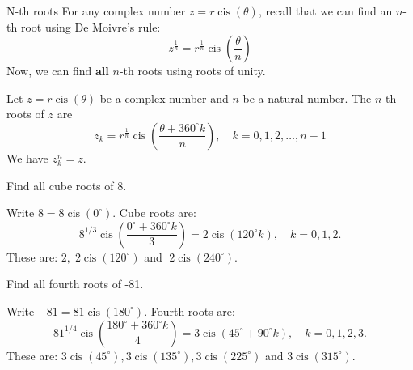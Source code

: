 \begin{frame}{N-th roots}
For any complex number $z = r\operatorname{cis}\!\left(\theta\right)$, recall that we can find an $n$-th root using De Moivre's rule:
\[ z^{\frac{1}{n}} = r^{\frac{1}{n}} \operatorname{cis}\!\left(\frac{\theta}{n}\right)\]
Now, we can find \textbf{all} $n$-th roots using roots of unity.
\begin{thm}{}{}
Let $z=r\operatorname{cis}\!\left(\theta\right)$ be a complex number and $n$ be a natural number. The $n$-th roots of $z$ are
\begin{equation}
z_k = r^{\frac{1}{n}} \operatorname{cis}\!\left(\frac{\theta + 360^\circ k}{n}\right), \quad k=0,1,2,\ldots,n-1
\end{equation}
We have $z_k^n = z$.
\end{thm}
\end{frame}

\begin{frame}[t]
\begin{ex}
Find all cube roots of 8.
\end{ex}
\begin{sol}
Write $8 = 8 \operatorname{cis}\!\left(0^\circ\right)$. Cube roots are:
\[ 8^{1/3} \operatorname{cis}\!\left(\frac{0^\circ + 360^\circ k}{3}\right) = 2 \operatorname{cis}\!\left(120^\circ k\right),\quad k=0,1,2. \]
These are: $2,\; 2\operatorname{cis}\!\left(120^\circ\right)$ and $\; 2\operatorname{cis}\!\left(240^\circ\right).$
\end{sol}
\end{frame}

\begin{frame}[t]
\begin{ex}
Find all fourth roots of -81.
\end{ex}
\begin{sol}
Write $-81 = 81 \operatorname{cis}\!\left(180^\circ\right)$. Fourth roots are:
\[ 81^{1/4} \operatorname{cis}\!\left(\frac{180^\circ + 360^\circ k}{4}\right) = 3 \operatorname{cis}\!\left(45^\circ + 90^\circ k\right),\quad k=0,1,2,3. \]
These are: $3 \operatorname{cis}\!\left(45^\circ\right), 3\operatorname{cis}\!\left(135^\circ\right), 3\operatorname{cis}\!\left(225^\circ\right)$ and $3\operatorname{cis}\!\left(315^\circ\right).$
\end{sol}
\end{frame}